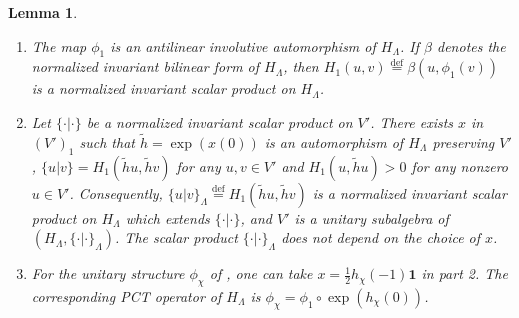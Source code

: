\documentclass[leqno]{article}
\newcommand{\ov}{\overset}
\newtheorem{lemma}[thm]{Lemma}
\numberwithin{equation}{section}
\begin{document}
\begin{lemma}
\label{lem:unitary-extension}
\begin{enumerate}
\item The map $\phi_1$ is an antilinear involutive automorphism of $H_\Lambda$. If $\beta$ denotes the normalized invariant bilinear form of $H_\Lambda$, then $H_1(u,v) \ov{\mathrm{def}}{=} \beta(u,\phi_1(v))$ is a normalized invariant scalar product on $H_\Lambda$.
\item Let $\{\cdot|\cdot\}$ be a normalized invariant scalar product on $V'$. There exists $x$ in $(V')_1$ such that $\tilde h = \exp(x(0))$ is an automorphism of $H_\Lambda$ preserving $V'$, $\{u|v\} = H_1(\tilde hu,\tilde hv)$ for any $u,v \in V'$ and $H_1(u,\tilde hu) > 0$ for any nonzero $u \in V'$. Consequently, $\{u|v\}_\Lambda \ov{\mathrm{def}}{=} H_1(\tilde hu,\tilde hv)$ is a normalized invariant scalar product on $H_\Lambda$ which extends $\{\cdot|\cdot\}$, and $V'$ is a unitary subalgebra of $(H_\Lambda,\{\cdot|\cdot\}_\Lambda)$. The scalar product $\{\cdot|\cdot\}_\Lambda$ does not depend on the choice of $x$.
\item For the unitary structure $\phi_\chi$ of \cite[Theorem 10.10]{Arh26}, one can take $x = \frac12 h_\chi(-1)\mathbf 1$ in part 2. The corresponding PCT operator of $H_\Lambda$ is $\phi_\chi = \phi_1 \circ \exp(h_\chi(0))$.
\end{enumerate}
\end{lemma}
\end{document}

